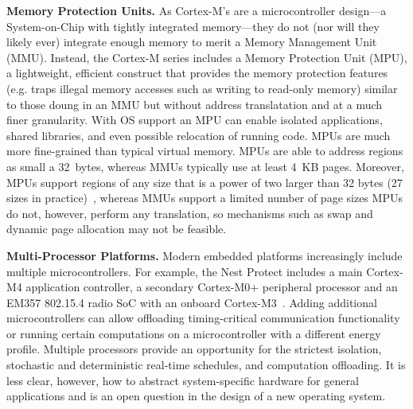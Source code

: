 {\bf Memory Protection Units.}
As Cortex-M's are a microcontroller design---a System-on-Chip with tightly
integrated memory---they do not (nor will they likely ever) integrate enough
memory to merit a Memory Management Unit (MMU). Instead, the Cortex-M series
includes a Memory Protection Unit (MPU), a lightweight, efficient construct
that provides the memory protection features (e.g. traps illegal memory
accesses such as writing to read-only memory) similar to those doung in an MMU
but without address translatation and at a much finer granularity.
With OS support an MPU can enable isolated applications, shared libraries, and
even possible relocation of running code.
MPUs are much more fine-grained than typical virtual memory. MPUs are able to
address regions as small a 32~bytes, whereas MMUs typically use at least 4~KB
pages. Moreover, MPUs support regions of any size that is a power of two larger
than 32 bytes (27 sizes in practice)~\cite{cortexm4-ug:ch4.5}, whereas MMUs
support a limited number of page sizes
MPUs do not, however, perform any translation, so mechanisms such as swap and
dynamic page allocation may not be feasible.

{\bf Multi-Processor Platforms.}
Modern embedded platforms increasingly include multiple microcontrollers.
For example, the Nest
Protect includes a main Cortex-M4 application controller, a secondary
Cortex-M0+ peripheral processor and an EM357 802.15.4 radio SoC with an
onboard Cortex-M3~\cite{nestprotect-teardown}.
Adding additional microcontrollers can allow offloading timing-critical
communication functionality or running certain computations on a microcontroller
with a different energy profile.
Multiple
processors provide an opportunity for
the strictest isolation, stochastic and deterministic real-time schedules, and
computation offloading. It is less clear, however, how to abstract
system-specific hardware for general applications and is an open question in
the design of a new operating system.


